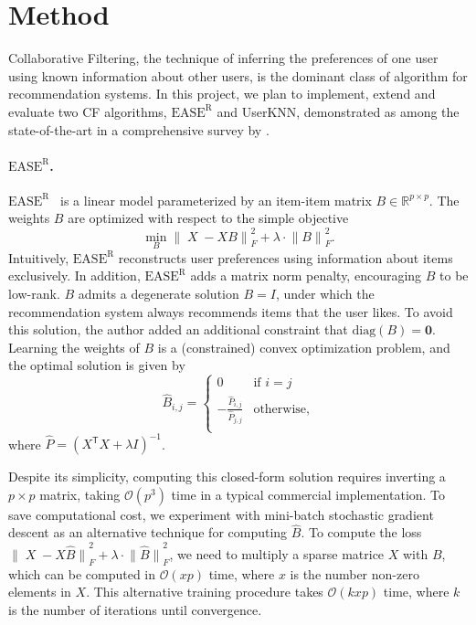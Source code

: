 \documentclass{article}
\DeclareMathOperator{\X}{\mathit{X}}
\newcommand{\easer}{$\text{EASE}^\text{R}$\xspace}
\newcommand{\userknn}{UserKNN\xspace}
\newcommand{\norm}[1]{\ensuremath{\lVert #1 \rVert}}
\newcommand{\transpose}[1]{{#1}^\mathsf{T}}
\begin{document}
\section{Method}
Collaborative Filtering, the technique of inferring the preferences of one user
 using known information about other users, is the dominant class of algorithm
 for recommendation systems.
In this project, we plan to implement, extend and evaluate two CF algorithms,
 \easer and \userknn, demonstrated as among the state-of-the-art in a
 comprehensive survey by \citet{anelliTopNRecommendationAlgorithms2022}.

\paragraph*{\easer.}
\easer~\citep{steckEmbarrassinglyShallowAutoencoders2019}
is a linear model parameterized by an item-item matrix $B \in
	\mathbb{R}^{p \times p}$.
The weights $B$ are optimized with respect to the simple objective
 \begin{equation} \min_B \norm{\X - X B}_F^2 + \lambda \cdot \norm{B}_F^2
 \text{.
}
\end{equation}
Intuitively, \easer reconstructs user preferences using information about items
 exclusively.
In addition, \easer adds a matrix norm penalty, encouraging $B$ to be low-rank.
$B$ admits a degenerate solution $B = I$, under which the
recommendation system always recommends items that the user likes.
To avoid this solution, the author added an additional constraint that
 $\mathrm{diag}(B) = \mathbf{0}$.
Learning the weights of $B$ is a (constrained) convex optimization problem, and
 the optimal solution is given by  \begin{equation} \hat{B}_{i, j} =
	 \begin{cases} 0 & \text{if $i = j$} \\ -\frac{\hat{P}_{i, j}}{\hat{P}_{j, j}} &
               \text{otherwise,}     \\\end{cases} \end{equation} where $\hat{P} =
	 (\transpose{X} X + \lambda I)^{-1}$.

Despite its simplicity, computing this closed-form solution requires inverting
 a $p \times p$ matrix, taking $\mathcal{O}(p^3)$ time in a typical commercial
 implementation.
To save computational cost, we experiment with mini-batch stochastic gradient
 descent as an alternative technique for computing $\hat{B}$.
To compute the loss $\norm{\X - X \hat{B}}_F^2 + \lambda \cdot
	 \norm{\hat{B}}_F^2$, we need to multiply a sparse matrice $X$ with $B$, which
 can be computed in $\mathcal{O}(x p)$ time, where $x$ is the number non-zero
 elements in $X$.
This alternative training procedure takes $\mathcal{O}(kxp)$ time, where $k$ is
 the number of iterations until convergence.
\end{document}
